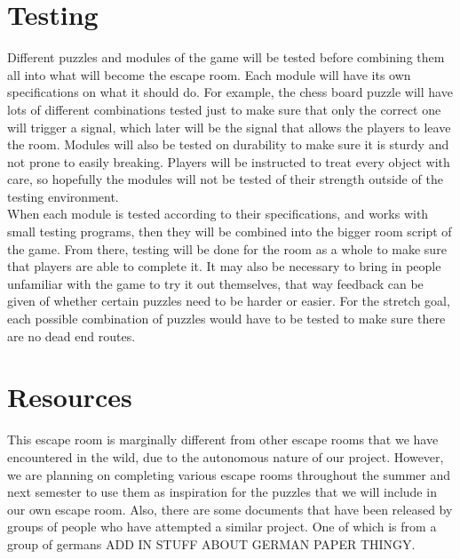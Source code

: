 \documentclass[conference]{IEEEtran}
\begin{document}
\section{Testing}
Different puzzles and modules of the game will be tested before combining
them all into what will become the escape room. Each module will have its
own specifications on what it should do. For example, the chess board puzzle
will have lots of different combinations tested just to make sure that only
the correct one will trigger a signal, which later will be the signal that
allows the players to leave the room. Modules will also be tested on
durability to make sure it is sturdy and not prone to easily breaking.
Players will be instructed to treat every object with care, so hopefully
the modules will not be tested of their strength outside of the testing
environment.
\\
\indent When each module is tested according to their specifications, and works
with small testing programs, then they will be combined into the bigger
room script of the game. From there, testing will be done for the room
as a whole to make sure that players are able to complete it. It may also
be necessary to bring in people unfamiliar with the game to try it out
themselves, that way feedback can be given of whether certain puzzles
need to be harder or easier. For the stretch goal, each possible combination
of puzzles would have to be tested to make sure there are no dead end routes.

\section{Resources}
This escape room is marginally different from other escape rooms that we have
encountered in the wild, due to the autonomous nature of our project. However,
we are planning on completing various escape rooms throughout the summer and
next semester to use them as inspiration for the puzzles that we will include
in our own escape room. Also, there are some documents that have been released
by groups of people who have attempted a similar project. One of which is from
a group of germans ADD IN STUFF ABOUT GERMAN PAPER THINGY.
\end{document}
